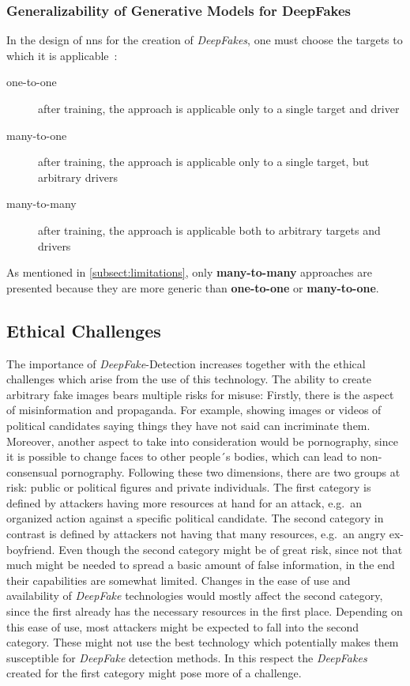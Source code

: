 \subsubsection{Generalizability of Generative Models for DeepFakes}\label{subsubsect:generalizability-deepfakes}
In the design of \glspl{nn} for the creation of \textit{DeepFakes}, one must choose the
targets to which it is applicable~\cite[cf.][]{Mirsky.2020}:
\begin{description}
    \item[one-to-one] after training, the approach is applicable only to a
    single target and driver
    \item[many-to-one] after training, the approach is applicable only to a
    single target, but arbitrary drivers
    \item[many-to-many] after training, the approach is applicable both to
    arbitrary targets and drivers
\end{description}
As mentioned in \cref{subsect:limitations}, only \textbf{many-to-many} approaches
are presented because they are more generic than \textbf{one-to-one} or
\textbf{many-to-one}.

\subsection{Ethical Challenges}
The importance of \textit{DeepFake}-Detection increases together with the ethical
challenges which arise from the use of this technology. The ability to create
arbitrary fake images bears multiple risks for misuse: Firstly, there is the
aspect of misinformation and propaganda. For example, showing images or videos
of political candidates saying things they have not said can incriminate
them. Moreover, another aspect to take into consideration would be pornography,
since it is possible to change faces to other people´s bodies, which can lead to
non-consensual pornography. Following these two dimensions, there are two groups
at risk: public or political figures and private individuals. The first category
is defined by attackers having more resources at hand for an attack, e.g.\ an
organized action against a specific political candidate. The second category in 
contrast is defined by attackers not having that many resources, e.g.\ an angry 
ex-boyfriend. Even though the second category might be of great risk, since not 
that much might be needed to spread a basic amount of false information, in the 
end their capabilities are somewhat limited. Changes in the ease of use and 
availability of \textit{DeepFake} technologies would mostly affect the second category, 
since the first already has the necessary resources in the first place. Depending 
on this ease of use, most attackers might be expected to fall into the second 
category. These might not use the best technology which potentially makes them 
susceptible for \textit{DeepFake} detection methods. In this respect the \textit{DeepFakes}
created for the first category might pose more of a challenge.
 